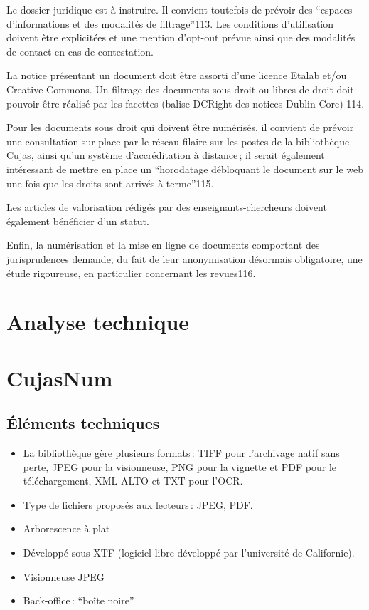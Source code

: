 Le dossier juridique est à instruire. Il convient toutefois de prévoir des \enquote{espaces d’informations et des modalités de filtrage}113. Les conditions d’utilisation doivent être explicitées et une mention d’opt-out prévue ainsi que des modalités de contact en cas de contestation.  

La notice présentant un document doit être assorti d’une licence Etalab et/ou Creative Commons. Un filtrage des documents sous droit ou libres de droit doit pouvoir être réalisé par les facettes (balise DCRight des notices Dublin Core) 114.  

Pour les documents sous droit qui doivent être numérisés, il convient de prévoir une consultation sur place par le réseau filaire sur les postes de la bibliothèque Cujas, ainsi qu’un système d’accréditation à distance ; il serait également intéressant de mettre en place un \enquote{horodatage débloquant le document sur le web une fois que les droits sont arrivés à terme}115.  

Les articles de valorisation rédigés par des enseignants-chercheurs doivent également bénéficier d’un statut. 

Enfin, la numérisation et la mise en ligne de documents comportant des jurisprudences demande, du fait de leur anonymisation désormais obligatoire, une étude rigoureuse, en particulier concernant les revues116.  



\section*{Analyse technique}

\section{CujasNum}

\subsection{Éléments techniques} 
\begin{itemize}
	\item La bibliothèque gère plusieurs formats :  TIFF pour l’archivage natif sans perte, JPEG pour la visionneuse, PNG pour la vignette et PDF pour le téléchargement, XML-ALTO et TXT pour l’OCR.
\item Type de fichiers proposés aux lecteurs : JPEG, PDF. 
\item Arborescence à plat 
\item Développé sous XTF (logiciel libre développé par l’université de Californie). 
\item Visionneuse JPEG 
\item Back-office : \enquote{boîte noire} 
\end{itemize}
\vfill

